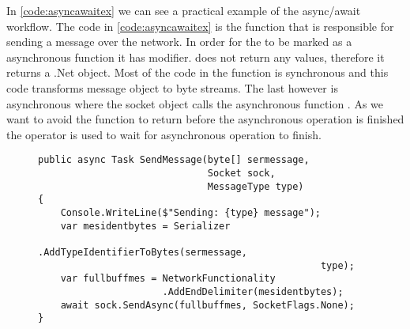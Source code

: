 In \autoref{code:asyncawaitex} we can see a practical example of the async/await workflow.
The code in \autoref{code:asyncawaitex} is the function that is responsible for sending a message over the network. In order for the  to be marked as a asynchronous function it has  modifier.  does not return any values, therefore it returns a .Net  object. Most of the code in the function is synchronous and this code transforms message object to byte streams. The last however is asynchronous where the socket object calls the asynchronous function . As we want to avoid the function to return before the asynchronous operation is finished the  operator is used to wait for asynchronous operation to finish.
\begin{figure}[h]
	\centering
	\lstset{style=sharpc}
	\begin{lstlisting}[label = code:asyncawaitex, caption=Example of async/await workflow, captionpos=b, basicstyle=\scriptsize]
public async Task SendMessage(byte[] sermessage, 
                              Socket sock, 
                              MessageType type)
{
    Console.WriteLine($"Sending: {type} message");
    var mesidentbytes = Serializer
                        .AddTypeIdentifierToBytes(sermessage, 
                                                  type);
    var fullbuffmes = NetworkFunctionality
                      .AddEndDelimiter(mesidentbytes);
    await sock.SendAsync(fullbuffmes, SocketFlags.None);
}


	\end{lstlisting}
\end{figure}


%
